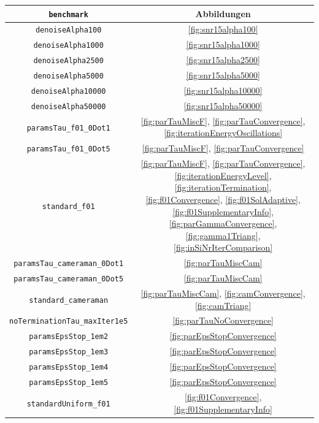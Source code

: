 \begin{table}
  \centering
  \begin{tabular}{c|c}
    \hline
    \texttt{benchmark} & Abbildungen\\  
    \hline 
    \texttt{denoiseAlpha100} &
    \ref{fig:snr15alpha100}\\
    \texttt{denoiseAlpha1000} &
    \ref{fig:snr15alpha1000}\\
    \texttt{denoiseAlpha2500} &
    \ref{fig:snr15alpha2500}\\
    \texttt{denoiseAlpha5000} &
    \ref{fig:snr15alpha5000}\\
    \texttt{denoiseAlpha10000} &
    \ref{fig:snr15alpha10000}\\
    \texttt{denoiseAlpha50000} &
    \ref{fig:snr15alpha50000}\\
    \texttt{paramsTau\_f01\_0Dot1} &
    \ref{fig:parTauMiscF}, \ref{fig:parTauConvergence},
    \ref{fig:iterationEnergyOscillations}\\
    \texttt{paramsTau\_f01\_0Dot5} &
    \ref{fig:parTauMiscF}, \ref{fig:parTauConvergence}\\
    \texttt{standard\_f01} &
    \ref{fig:parTauMiscF}, \ref{fig:parTauConvergence}, 
    \ref{fig:iterationEnergyLevel}, \ref{fig:iterationTermination},
    \ref{fig:f01Convergence}, \ref{fig:f01SolAdaptive},
    \ref{fig:f01SupplementaryInfo}, \ref{fig:parGammaConvergence},
    \ref{fig:gamma1Triang}, \ref{fig:inSiNrIterComparison}\\
    \texttt{paramsTau\_cameraman\_0Dot1} &
    \ref{fig:parTauMiscCam}\\
    \texttt{paramsTau\_cameraman\_0Dot5} &
    \ref{fig:parTauMiscCam} \\
    \texttt{standard\_cameraman} &
    \ref{fig:parTauMiscCam}, \ref{fig:camConvergence}, \ref{fig:camTriang}\\
    \texttt{noTerminationTau\_maxIter1e5} &
    \ref{fig:parTauNoConvergence}\\
    \texttt{paramsEpsStop\_1em2} &
    \ref{fig:parEpsStopConvergence}\\
    \texttt{paramsEpsStop\_1em3} &
    \ref{fig:parEpsStopConvergence}\\
    \texttt{paramsEpsStop\_1em4} &
    \ref{fig:parEpsStopConvergence}\\
    \texttt{paramsEpsStop\_1em5} &
    \ref{fig:parEpsStopConvergence}\\
    \texttt{standardUniform\_f01} &
    \ref{fig:f01Convergence}, \ref{fig:f01SupplementaryInfo}\\

\end{tabular}
\end{table}
